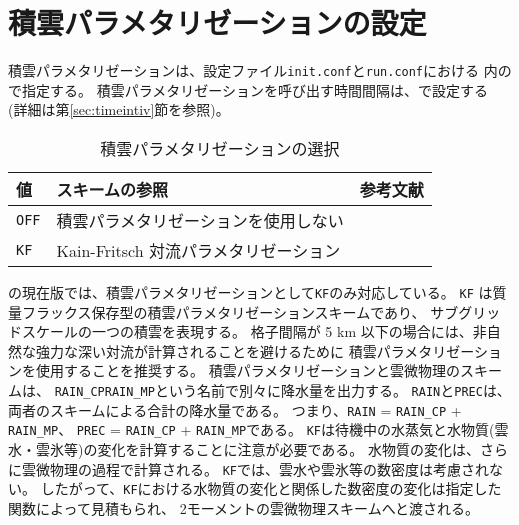 \section{積雲パラメタリゼーションの設定} \label{sec:basic_usel_cumulus}

積雲パラメタリゼーションは、設定ファイル\verb|init.conf|と\verb|run.conf|における
内ので指定する。
積雲パラメタリゼーションを呼び出す時間間隔は、で設定する
(詳細は第\ref{sec:timeintiv}節を参照)。

\begin{table}[h]
\begin{center}
  \caption{積雲パラメタリゼーションの選択}
  \label{tab:nml_atm_cp}
  \begin{tabularx}{150mm}{lXX} \hline
    \rowcolor[gray]{0.9}  値 & スキームの参照 & 参考文献 \\ \hline
      \verb|OFF|  & 積雲パラメタリゼーションを使用しない &  \\
      \verb|KF|   & Kain-Fritsch 対流パラメタリゼーション & \citet{kain_1990,kain_2004} \\
    \hline
  \end{tabularx}
\end{center}
\end{table}

\scalerm の現在版では、積雲パラメタリゼーションとして\verb|KF|のみ対応している。
\verb|KF| は質量フラックス保存型の積雲パラメタリゼーションスキームであり、
サブグリッドスケールの一つの積雲を表現する。
格子間隔が 5 km 以下の場合には、非自然な強力な深い対流が計算されることを避けるために
積雲パラメタリゼーションを使用することを推奨する。
積雲パラメタリゼーションと雲微物理のスキームは、
\verb|RAIN_CP|\verb|RAIN_MP|という名前で別々に降水量を出力する。
\verb|RAIN|と\verb|PREC|は、両者のスキームによる合計の降水量である。
つまり、\verb|RAIN| = \verb|RAIN_CP| + \verb|RAIN_MP|、
\verb|PREC| = \verb|RAIN_CP| + \verb|RAIN_MP|である。
\verb|KF|は待機中の水蒸気と水物質(雲水・雲氷等)の変化を計算することに注意が必要である。
水物質の変化は、さらに雲微物理の過程で計算される。
\verb|KF|では、雲水や雲氷等の数密度は考慮されない。
したがって、\verb|KF|における水物質の変化と関係した数密度の変化は指定した関数によって見積もられ、
2モーメントの雲微物理スキームへと渡される。

